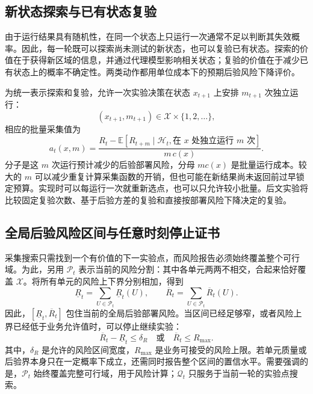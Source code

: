 \documentclass[UTF8,11pt,a4paper,fontset=none]{ctexart}
\newcommand{\X}{\mathcal X}
\newcommand{\Hh}{\mathcal H}
\newcommand{\E}{\mathbb E}
\newcommand{\1}{\mathbf 1}
\begin{document}
\subsection{新状态探索与已有状态复验}

由于运行结果具有随机性，在同一个状态上只运行一次通常不足以判断其失效概率。因此，每一轮既可以探索尚未测试的新状态，也可以复验已有状态。探索的价值在于获得新区域的信息，并通过代理模型影响相关状态；复验的价值在于减少已有状态上的概率不确定性。两类动作都用单位成本下的预期后验风险下降评价。

为统一表示探索和复验，允许一次实验决策在状态 $x_{t+1}$ 上安排 $m_{t+1}$ 次独立运行：
\begin{equation}
  (x_{t+1},m_{t+1})
  \in\X\times\{1,2,\ldots\},
\end{equation}
相应的批量采集值为
\begin{equation}
  a_t(x,m)=
  \frac{R_t-\E[R_{t+m}\mid\Hh_t,
  \text{在 }x\text{ 处独立运行 }m\text{ 次}]}{m\,c(x)}.
\end{equation}
分子是这 $m$ 次运行预计减少的后验部署风险，分母 $m c(x)$ 是批量运行成本。较大的 $m$ 可以减少重复计算采集函数的开销，但也可能在新结果尚未返回前过早锁定预算。实现时可以每运行一次就重新选点，也可以只允许较小批量。后文实验将比较固定复验次数、基于后验方差的复验和直接按部署风险下降决定的复验。

\subsection{全局后验风险区间与任意时刻停止证书}

采集搜索只需找到一个有价值的下一实验点，而风险报告必须始终覆盖整个可行域。为此，另用 $\mathcal P_t$ 表示当前的风险分割：其中各单元两两不相交，合起来恰好覆盖 $\X$。将所有单元的风险上下界分别相加，得到
\begin{equation}
  \underline R_t
  =\sum_{U\in\mathcal P_t}\underline R_t(U),
  \qquad
  \overline R_t
  =\sum_{U\in\mathcal P_t}\overline R_t(U).
  \label{eq:anytime-risk}
\end{equation}
因此，$[\underline R_t,\overline R_t]$ 包住当前的全局后验部署风险。当区间已经足够窄，或者风险上界已经低于业务允许值时，可以停止继续实验：
\begin{equation}
  \overline R_t-\underline R_t\leq\delta_R
  \quad\text{或}\quad
  \overline R_t\leq R_{\max}.
\end{equation}
其中，$\delta_R$ 是允许的风险区间宽度，$R_{\max}$ 是业务可接受的风险上限。若单元质量或后验界本身只在一定概率下成立，还需同时报告整个区间的置信水平。需要强调的是，$\mathcal P_t$ 始终覆盖完整可行域，用于风险计算；$\mathcal Q_t$ 只服务于当前一轮的实验点搜索。
\end{document}
